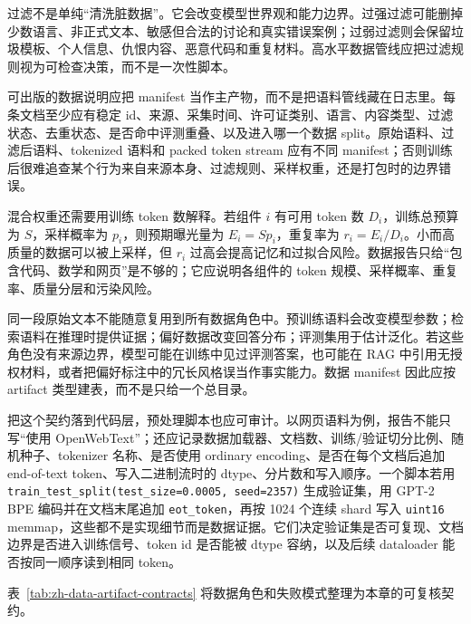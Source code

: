 \documentclass[UTF8,zihao=-4,openany]{ctexbook}
\begin{document}
过滤不是单纯“清洗脏数据”。它会改变模型世界观和能力边界。过强过滤可能删掉少数语言、非正式文本、敏感但合法的讨论和真实错误案例；过弱过滤则会保留垃圾模板、个人信息、仇恨内容、恶意代码和重复材料。高水平数据管线应把过滤规则视为可检查决策，而不是一次性脚本。

可出版的数据说明应把 manifest 当作主产物，而不是把语料管线藏在日志里。每条文档至少应有稳定 id、来源、采集时间、许可证类别、语言、内容类型、过滤状态、去重状态、是否命中评测重叠、以及进入哪一个数据 split。原始语料、过滤后语料、tokenized 语料和 packed token stream 应有不同 manifest；否则训练后很难追查某个行为来自来源本身、过滤规则、采样权重，还是打包时的边界错误。

混合权重还需要用训练 token 数解释。若组件 $i$ 有可用 token 数 $D_i$，训练总预算为 $S$，采样概率为 $p_i$，则预期曝光量为 $E_i=Sp_i$，重复率为 $r_i=E_i/D_i$。小而高质量的数据可以被上采样，但 $r_i$ 过高会提高记忆和过拟合风险。数据报告只给“包含代码、数学和网页”是不够的；它应说明各组件的 token 规模、采样概率、重复率、质量分层和污染风险。

同一段原始文本不能随意复用到所有数据角色中。预训练语料会改变模型参数；检索语料在推理时提供证据；偏好数据改变回答分布；评测集用于估计泛化。若这些角色没有来源边界，模型可能在训练中见过评测答案，也可能在 RAG 中引用无授权材料，或者把偏好标注中的冗长风格误当作事实能力。数据 manifest 因此应按 artifact 类型建表，而不是只给一个总目录。

把这个契约落到代码层，预处理脚本也应可审计。以网页语料为例，报告不能只写“使用 OpenWebText”；还应记录数据加载器、文档数、训练/验证切分比例、随机种子、tokenizer 名称、是否使用 ordinary encoding、是否在每个文档后追加 end-of-text token、写入二进制流时的 dtype、分片数和写入顺序。一个脚本若用 \texttt{train\_test\_split(test\_size=0.0005, seed=2357)} 生成验证集，用 GPT-2 BPE 编码并在文档末尾追加 \texttt{eot\_token}，再按 1024 个连续 shard 写入 \texttt{uint16} memmap，这些都不是实现细节而是数据证据。它们决定验证集是否可复现、文档边界是否进入训练信号、token id 是否能被 dtype 容纳，以及后续 dataloader 能否按同一顺序读到相同 token。

表~\ref{tab:zh-data-artifact-contracts} 将数据角色和失败模式整理为本章的可复核契约。
\end{document}
